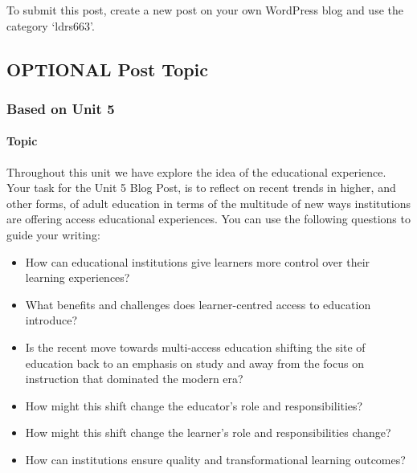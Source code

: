 \documentclass[
]{book}
\providecommand{\tightlist}{%
  \setlength{\itemsep}{0pt}\setlength{\parskip}{0pt}}
\begin{document}
To submit this post, create a new post on your own WordPress blog and use the category `ldrs663'.

\hypertarget{optional-post-topic}{%
\subsection*{OPTIONAL Post Topic}\label{optional-post-topic}}

\hypertarget{based-on-unit-5}{%
\subsubsection*{Based on Unit 5}\label{based-on-unit-5}}

\hypertarget{topic-2}{%
\paragraph*{Topic}\label{topic-2}}

Throughout this unit we have explore the idea of the educational experience. Your task for the Unit 5 Blog Post, is to reflect on recent trends in higher, and other forms, of adult education in terms of the multitude of new ways institutions are offering access educational experiences. You can use the following questions to guide your writing:

\begin{itemize}
\tightlist
\item
  How can educational institutions give learners more control over their learning experiences?\\
\item
  What benefits and challenges does learner-centred access to education introduce?\\
\item
  Is the recent move towards multi-access education shifting the site of education back to an emphasis on study and away from the focus on instruction that dominated the modern era?\\
\item
  How might this shift change the educator's role and responsibilities?\\
\item
  How might this shift change the learner's role and responsibilities change?\\
\item
  How can institutions ensure quality and transformational learning outcomes?
\end{itemize}
\end{document}
